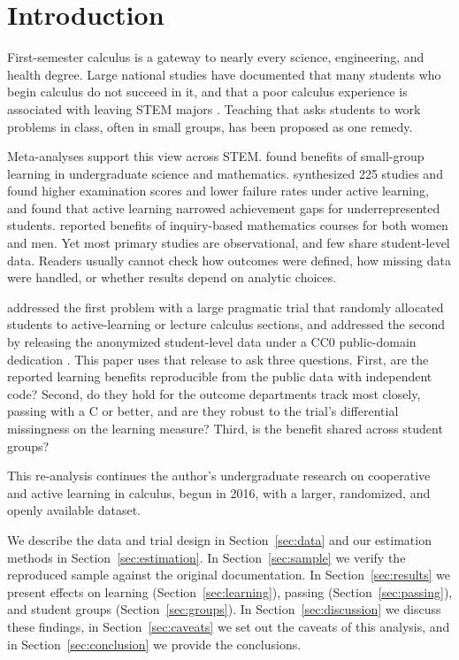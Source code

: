 \documentclass[10pt,twocolumn,letterpaper]{article}
\begin{document}
\section{Introduction}

First-semester calculus is a gateway to nearly every science, engineering, and health degree. Large national studies have documented that many students who begin calculus do not succeed in it, and that a poor calculus experience is associated with leaving STEM majors \citep{bressoud2015}. Teaching that asks students to work problems in class, often in small groups, has been proposed as one remedy.

Meta-analyses support this view across STEM. \citet{springer1999} found benefits of small-group learning in undergraduate science and mathematics. \citet{freeman2014} synthesized 225 studies and found higher examination scores and lower failure rates under active learning, and \citet{theobald2020} found that active learning narrowed achievement gaps for underrepresented students. \citet{laursen2014} reported benefits of inquiry-based mathematics courses for both women and men. Yet most primary studies are observational, and few share student-level data. Readers usually cannot check how outcomes were defined, how missing data were handled, or whether results depend on analytic choices.

\citet{kramer2023} addressed the first problem with a large pragmatic trial that randomly allocated students to active-learning or lecture calculus sections, and addressed the second by releasing the anonymized student-level data under a CC0 public-domain dedication \citep{kramer2023data}. This paper uses that release to ask three questions. First, are the reported learning benefits reproducible from the public data with independent code? Second, do they hold for the outcome departments track most closely, passing with a C or better, and are they robust to the trial's differential missingness on the learning measure? Third, is the benefit shared across student groups?

This re-analysis continues the author's undergraduate research on cooperative and active learning in calculus, begun in 2016, with a larger, randomized, and openly available dataset.

We describe the data and trial design in Section~\ref{sec:data} and our estimation methods in Section~\ref{sec:estimation}. In Section~\ref{sec:sample} we verify the reproduced sample against the original documentation. In Section~\ref{sec:results} we present effects on learning (Section~\ref{sec:learning}), passing (Section~\ref{sec:passing}), and student groups (Section~\ref{sec:groups}). In Section~\ref{sec:discussion} we discuss these findings, in Section~\ref{sec:caveats} we set out the caveats of this analysis, and in Section~\ref{sec:conclusion} we provide the conclusions.
\end{document}
